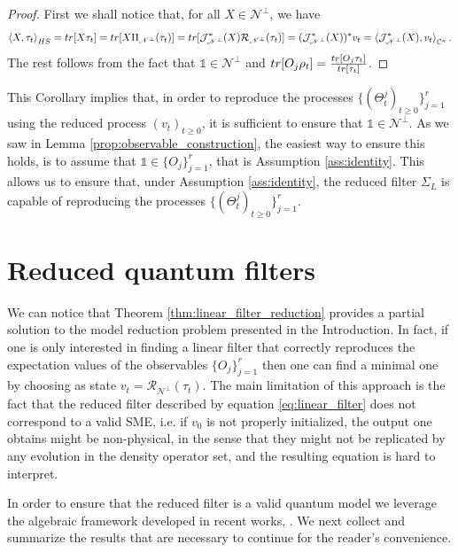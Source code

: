 \documentclass[aihp,12pt]{imsart}
\newcommand{\Jc}{\mathcal{J}}
\newcommand{\Rc}{\mathcal{R}}
\newcommand{\Ns}{\mathscr{N}}
\newcommand{\Cb}{\mathbb{C}}
\newcommand{\one}{\mathbb{1}}
\newcommand{\tr}{{\rm tr}}
\newcommand{\inner}[2]{\left< #1,#2 \right>}
\theoremstyle{theorem}
\theoremstyle{definition}
\theoremstyle{remark}
\begin{document}
\begin{proof}
    First we shall notice that, for all $X\in\Ns^\perp$, we have \[\inner{X}{\tau_t}_{HS} = \tr[X\tau_t] = \tr[X \Pi_{\Ns^\perp}(\tau_t)] = \tr[\Jc^*_{\Ns^\perp}(X) \Rc_{\Ns^\perp}(\tau_t)] = (\Jc^*_{\Ns^\perp}(X))^* v_t = \inner{\Jc^*_{\Ns^\perp}(X)}{v_t}_{\Cb^\kappa}.\] The rest follows from the fact that $\one\in\Ns^\perp$ and $\tr[O_j\rho_t] = \frac{\tr[O_j\tau_t]}{\tr[\tau_t]}$. 
\end{proof}

This Corollary implies that, in order to reproduce the processes $\{(\Theta_t^j)_{t\geq0}\}_{j=1}^r$ using the reduced process $(v_t)_{t\geq0}$, it is sufficient to ensure that $\one\in\Ns^\perp$. As we saw in Lemma \ref{prop:observable_construction}, the easiest way to ensure this holds, is to assume that $\one\in\{O_j\}_{j=1}^r$, that is Assumption \ref{ass:identity}. This allows us to ensure that, under Assumption \ref{ass:identity}, the reduced filter $\Sigma_L$ is capable of reproducing the processes $\{(\Theta_t^j)_{t\geq0}\}_{j=1}^r$.
 
\section{Reduced quantum filters}
\label{sec:reduced_quantum_filters}
We can notice that Theorem \ref{thm:linear_filter_reduction} provides a partial solution to the model reduction problem presented in the Introduction. In fact, if one is only interested in finding a linear filter that correctly reproduces the expectation values of the observables $\{O_j\}_{j=1}^r$ then one can find a minimal one by choosing as state $v_t=\Rc_{\Ns^\perp}(\tau_t)$. 
The main limitation of this approach is the fact that the reduced filter described by equation \eqref{eq:linear_filter}  does not correspond to a valid SME, i.e. if $v_0$ is not properly initialized, the output one obtains might be non-physical, in the sense that they might not be replicated by any evolution in the density operator set, and the resulting equation is hard to interpret.

In order to ensure that the reduced filter is a valid quantum model we leverage the algebraic framework developed in recent works, \cite{tit2023, letter2024, prxq2024}. We next collect and summarize the results that are necessary to continue for the reader's convenience.
\end{document}
